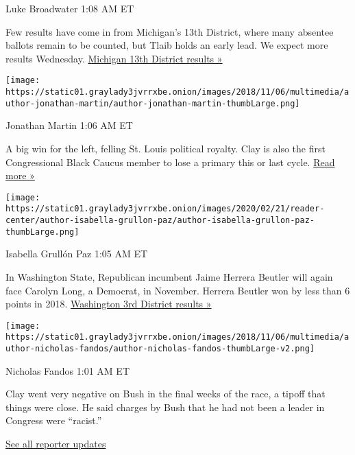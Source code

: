 Luke Broadwater 1:08 AM ET

Few results have come in from Michigan's 13th District, where many
absentee ballots remain to be counted, but Tlaib holds an early lead. We
expect more results Wednesday.
\href{https://www.nytimes3xbfgragh.onion/interactive/2020/08/04/us/elections/results-michigan-house-district-13-primary-election.html?action=click\&module=ELEX_results\&pgtype=Interactive\&region=ReporterUpdates}{Michigan
13th District results »}

\texttt{[image: https://static01.graylady3jvrrxbe.onion/images/2018/11/06/multimedia/author-jonathan-martin/author-jonathan-martin-thumbLarge.png]}

Jonathan Martin 1:06 AM ET

A big win for the left, felling St. Louis political royalty. Clay is
also the first Congressional Black Caucus member to lose a primary this
or last cycle.
\href{https://www.nytimes3xbfgragh.onion/2020/08/05/us/politics/cori-bush-missouri-william-lacy-clay.html?action=click\&module=ELEX_results\&pgtype=Interactive\&region=ReporterUpdates}{Read
more »}

\texttt{[image: https://static01.graylady3jvrrxbe.onion/images/2020/02/21/reader-center/author-isabella-grullon-paz/author-isabella-grullon-paz-thumbLarge.png]}

Isabella Grullón Paz 1:05 AM ET

In Washington State, Republican incumbent Jaime Herrera Beutler will
again face Carolyn Long, a Democrat, in November. Herrera Beutler won by
less than 6 points in 2018.
\href{https://www.nytimes3xbfgragh.onion/interactive/2020/08/04/us/elections/results-washington-house-district-3-primary-election.html?action=click\&module=ELEX_results\&pgtype=Interactive\&region=ReporterUpdates}{Washington
3rd District results »}

\texttt{[image: https://static01.graylady3jvrrxbe.onion/images/2018/11/06/multimedia/author-nicholas-fandos/author-nicholas-fandos-thumbLarge-v2.png]}

Nicholas Fandos 1:01 AM ET

Clay went very negative on Bush in the final weeks of the race, a tipoff
that things were close. He said charges by Bush that he had not been a
leader in Congress were ``racist.''

\href{https://www.nytimes3xbfgragh.onion/interactive/2020/08/04/us/elections/live-analysis-arizona-kansas-michigan-missouri-primaries.html?action=click\&module=ELEX_results\&pgtype=Interactive\&region=Component}{See
all reporter updates}

